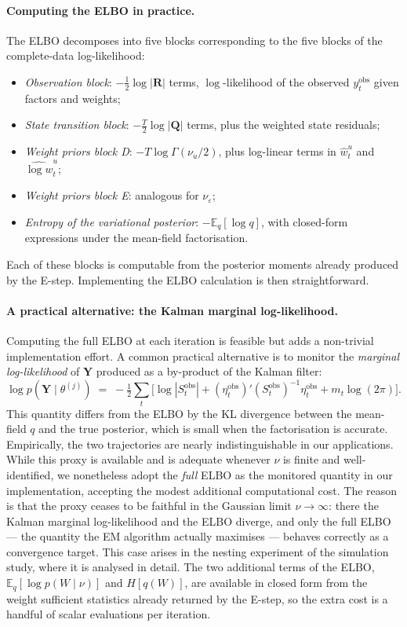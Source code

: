 \documentclass[11pt, a4paper, oneside]{article}
\begin{document}
\paragraph{Computing the ELBO in practice.}
The ELBO decomposes into five blocks corresponding to the five blocks
of the complete-data log-likelihood:
\begin{itemize}[leftmargin=1.5em, itemsep=2pt]
    \item \emph{Observation block}: $-\tfrac{1}{2}\log|\mathbf{R}|$ terms, $\log$-likelihood of the observed $y_t^{\mathrm{obs}}$ given factors and weights;
    \item \emph{State transition block}: $-\tfrac{T}{2}\log|\mathbf{Q}|$ terms, plus the weighted state residuals;
    \item \emph{Weight priors block D}: $-T\log\Gamma(\nu_u/2)$, plus log-linear terms in $\hat{w}^u_t$ and $\widehat{\log w}^u_t$;
    \item \emph{Weight priors block E}: analogous for $\nu_\varepsilon$;
    \item \emph{Entropy of the variational posterior}: $-\mathbb{E}_q[\log q]$, with closed-form expressions under the mean-field factorisation.
\end{itemize}
Each of these blocks is computable from the posterior moments already
produced by the E-step. Implementing the ELBO calculation is then
straightforward.

\paragraph{A practical alternative: the Kalman marginal log-likelihood.}
Computing the full ELBO at each iteration is feasible but adds a non-trivial
implementation effort. A common practical alternative is to monitor the
\emph{marginal log-likelihood} of $\mathbf{Y}$ produced as a by-product
of the Kalman filter:
\[
\log p(\mathbf{Y} \mid \theta^{(j)}) \;=\; -\tfrac{1}{2}\sum_t \big[\log|S_t^{\mathrm{obs}}| + (\eta_t^{\mathrm{obs}})' (S_t^{\mathrm{obs}})^{-1} \eta_t^{\mathrm{obs}} + m_t \log(2\pi)\big].
\]
This quantity differs from the ELBO by the KL divergence between the
mean-field $q$ and the true posterior, which is small when the
factorisation is accurate. Empirically, the two trajectories are
nearly indistinguishable in our applications. While this proxy is available and is adequate whenever $\nu$ is
finite and well-identified, we nonetheless adopt the \emph{full}
ELBO as the monitored quantity in our implementation, accepting the
modest additional computational cost. The reason is that the
proxy ceases to be faithful in the Gaussian limit $\nu \to \infty$:
there the Kalman marginal log-likelihood and the ELBO diverge, and
only the full ELBO --- the quantity the EM algorithm actually
maximises --- behaves correctly as a convergence target. This case
arises in the nesting experiment of the simulation study, where it is analysed in detail. The
two additional terms of the ELBO, $\mathbb{E}_q[\log p(W\mid\nu)]$ and
$H[q(W)]$, are available in closed form from the weight sufficient
statistics already returned by the E-step, so the extra cost is a
handful of scalar evaluations per iteration.
\end{document}
